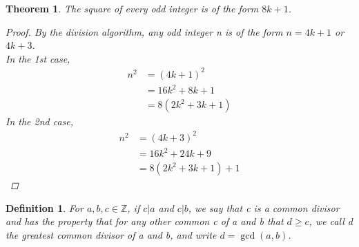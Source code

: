 \documentclass[letterpaper]{article}
\newtheorem{theorem}{Theorem}[section]
\newtheorem{definition}{Definition}[section]
\begin{document}
    \begin{theorem}
        The square of every odd integer is of the form $8k+1$.
        \begin{proof}
            By the division algorithm, any odd integer n is of the form $n=4k+1$ or 
            $4k+3$. \\
            In the 1st case,
            \begin{align*}
                n^2 &= (4k+1)^2 \\
                &= 16k^2+8k+1 \\
                &= 8(2k^2+3k+1)
            \end{align*}
            In the 2nd case,
            \begin{align*}
                n^2 &=(4k+3)^2 \\
                &= 16k^2+24k+9 \\
                &= 8(2k^2+3k+1)+1
            \end{align*}
        \end{proof}
    \end{theorem}

    \begin{definition}
        For $a,b,c\in\mathbb{Z}$, if $c|a$ and $c|b$, we say that c is a common divisor 
        and has the property that for any other common c of a and b that $d\geq c$, 
        we call d the greatest common divisor of a and b, and write $d=\gcd(a,b)$.
    \end{definition}
\end{document}

